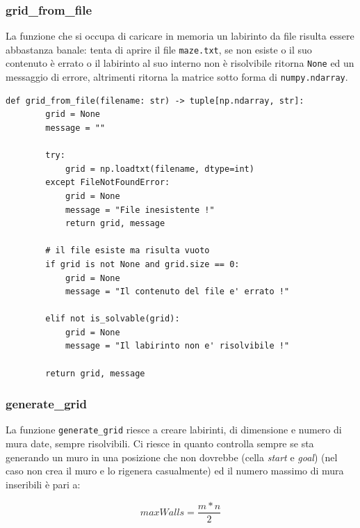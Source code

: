 \subsubsection{grid\_from\_file}
La funzione che si occupa di caricare in memoria un labirinto da file risulta essere abbastanza banale: tenta di aprire il file \lstinline[style=cmd]|maze.txt|, se non esiste o il suo contenuto \`{e} errato o il labirinto al suo interno non \`{e} risolvibile ritorna \lstinline[style=cmd]|None| ed un messaggio di errore, altrimenti ritorna la matrice sotto forma di \lstinline[style=cmd]|numpy.ndarray|.

\begin{lstlisting}[style=python, caption={Funzione per il caricamento in memoria di un labirinto da file}]
	def grid_from_file(filename: str) -> tuple[np.ndarray, str]:
		grid = None
		message = ""
	
		try:
			grid = np.loadtxt(filename, dtype=int)
		except FileNotFoundError:
			grid = None
			message = "File inesistente !"
			return grid, message
	
		# il file esiste ma risulta vuoto
		if grid is not None and grid.size == 0:
			grid = None
			message = "Il contenuto del file e' errato !"
	
		elif not is_solvable(grid):
			grid = None
			message = "Il labirinto non e' risolvibile !"
	
		return grid, message
\end{lstlisting}

\subsubsection{generate\_grid}
La funzione \lstinline[style=cmd]|generate_grid| riesce a creare labirinti, di dimensione e numero di mura date, sempre risolvibili. Ci riesce in quanto controlla sempre se sta generando un muro in una posizione che non dovrebbe (cella \textit{start} e \textit{goal}) (nel caso non crea il muro e lo rigenera casualmente) ed il numero massimo di mura inseribili \`{e} pari a: 

\[maxWalls = \frac{m * n}{2}\]

